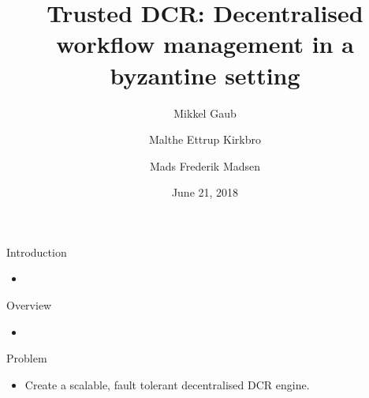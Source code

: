 \documentclass{beamer}
\title{Trusted DCR: Decentralised workflow management in a byzantine setting}
\author{Mikkel Gaub \and Malthe Ettrup Kirkbro \and Mads Frederik Madsen}
\date{June 21, 2018}
\begin{document}
\maketitle

\begin{frame}{Introduction}%
%
    \begin{itemize}
    	\item 
    \end{itemize}
\end{frame}

\begin{frame}{Overview}%
	\begin{itemize}
		\item 
	\end{itemize}
\end{frame}

\begin{frame}{Problem}%
\begin{itemize}
	\item Create a scalable, fault tolerant decentralised DCR engine.
\end{itemize}
\end{frame}
\end{document}
